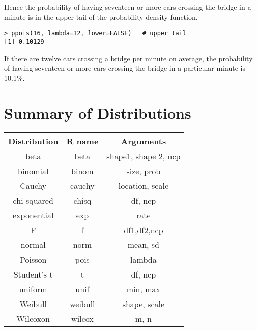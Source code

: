 \documentclass[a4paper,12pt]{article}
\begin{document}
Hence the probability of having seventeen or more cars crossing the bridge in a minute is in the upper tail of the probability density function. 
\begin{verbatim}
> ppois(16, lambda=12, lower=FALSE)   # upper tail 
[1] 0.10129 
\end{verbatim}

If there are twelve cars crossing a bridge per minute on average, the probability of having seventeen or more cars crossing the bridge in a particular minute is 10.1\%. 







\section{Summary of Distributions}
\begin{center}
\begin{tabular}{|c|c|c|}
\hline
Distribution &	R name & Arguments\\ \hline
beta &	beta &	shape1, shape 2, ncp\\
binomial &	binom	& size, prob\\
Cauchy	& cauchy	& location, scale\\
chi-squared &	chisq &	df, ncp\\
exponential	& exp &	rate\\
F	& f	& df1,df2,ncp\\
normal &	norm &	mean, sd\\
Poisson&	pois & 	lambda\\
Student's t	& t&	df, ncp\\
uniform	& unif &	min, max\\
Weibull	& weibull & shape, scale\\
Wilcoxon &	wilcox &	m, n\\ 
\hline 
\end{tabular}
\end{center}
 
 
\end{document}
